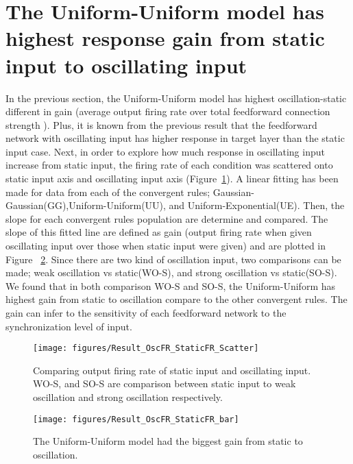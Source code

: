 \section{The Uniform-Uniform model has highest response gain from static input to oscillating input}
 In the previous section, the Uniform-Uniform model has highest oscillation-static different  in gain (average output firing rate over total feedforward connection strength ). Plus, it is known from the previous result that the feedforward network with oscillating input has higher response in target layer than the static input case.  
Next, in order to explore how much response in oscillating input increase from static input, the firing rate of each condition was scattered onto static input axis and oscillating input axis (Figure~\ref{fig:ResFunDiffOscS}). A linear fitting has been made for data from each of the convergent rules; Gaussian-Gaussian(GG),Uniform-Uniform(UU), and Uniform-Exponential(UE).   Then, the slope for each convergent rules population are determine and compared. The slope of this fitted line are defined as gain (output firing rate when given oscillating input over those when static input were given) and are plotted in Figure ~\ref{fig:ResFunDiffOscS_hp}. Since there are two kind of oscillation input, two comparisons can be made; weak oscillation vs static(WO-S), and strong oscillation vs static(SO-S). We found that in both comparison WO-S and SO-S, the Uniform-Uniform has highest gain from static to oscillation compare to the other convergent rules. The gain can infer to the sensitivity of each feedforward network to the synchronization level of input. 



\begin{figure}[!h]
	\centering
	\texttt{[image: figures/Result\_OscFR\_StaticFR\_Scatter]}
	\caption{Comparing output firing rate of static input and oscillating input. WO-S, and SO-S are comparison between static input to weak oscillation and strong oscillation respectively.}
	\label{fig:ResFunDiffOscS}
\end{figure}


\begin{figure}[!h]
	\centering
	\texttt{[image: figures/Result\_OscFR\_StaticFR\_bar]}
	\caption{The Uniform-Uniform model had the biggest gain from static to oscillation.}
	\label{fig:ResFunDiffOscS_hp}
\end{figure}


